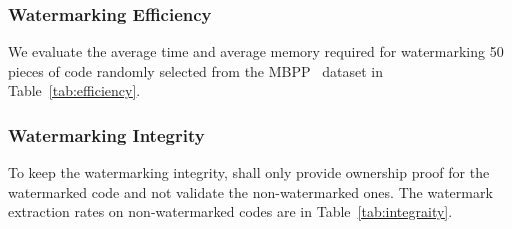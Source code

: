 \begin{table*}[!ht]
  \centering
  \caption{
  \label{tab:fidelity}}
\end{table*}

\subsubsection{Watermarking Efficiency}
We evaluate the average time and average memory required for watermarking 50 pieces of code randomly selected from the MBPP~\cite{austin2021program} dataset in Table~\ref{tab:efficiency}. 

\begin{table}[!ht]
    \centering
    \caption{Watermarking efficiency of different methods.}
    \label{tab:efficiency}
\end{table}

\subsubsection{Watermarking Integrity}
To keep the watermarking integrity, \sys{} shall only provide ownership proof for the watermarked code and not validate the non-watermarked ones. The watermark extraction rates on non-watermarked codes are in Table~\ref{tab:integraity}.

